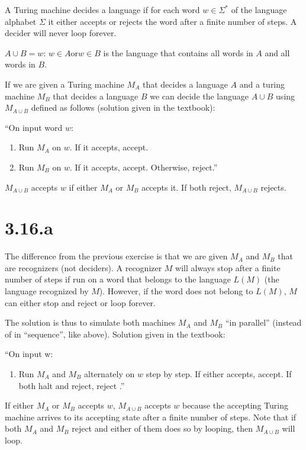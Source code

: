 \documentclass{article}
\newcommand\st{\colon\,}
\begin{document}
A Turing machine decides a language if for each word \(w \in \Sigma^{*}\)
of the language alphabet \(\Sigma\)
it either accepts or rejects the word after a finite number of steps. A decider
will never loop forever.

\(A \cup B = {w \st w \in A \text{or} w \in B}\)
is the language that contains all words in \(A\) and all words in \(B\).

If we are given a Turing machine \(M_A\) that decides a language \(A\) and
a turing machine \(M_B\) that decides a language \(B\) we can decide the
language \(A \cup B\) using \(M_{A \cup B}\) defined as follows
(solution given in the textbook):

``On input word \(w\):
\begin{enumerate}
	\item Run \(M_A\) on \(w\). If it accepts, accept.
	\item Run \(M_B\) on \(w\). If it accepts, accept. Otherwise, reject.''
\end{enumerate}
\(M_{A \cup B}\) accepts \(w\) if either \(M_A\) or \(M_B\) accepts it.
If both reject, \(M_{A \cup B}\) rejects.

\section*{3.16.a}

The difference from the previous exercise is that we are given \(M_A\) and
\(M_B\) that are recognizers (not deciders). A recognizer \(M\) will always stop
after a finite number of steps if run on a word that belongs to the language
\(L(M)\) (the language recognized by \(M\)).
However, if the word does not belong to \(L(M)\), \(M\) can either stop and reject or loop forever.

The solution is thus to simulate both machines \(M_A\) and \(M_B\) ``in
parallel'' (instead of in ``sequence'', like above). Solution given in the textbook:

``On input w:
\begin{enumerate}
	\item Run \(M_A\) and \(M_B\) alternately on \(w\) step by step. If either accepts,
accept. If both halt and reject, reject .''
\end{enumerate}

If either \(M_A\) or \(M_B\) accepts \(w\), \(M_{A \cup B}\) accepts \(w\)
because the accepting Turing machine arrives to its
accepting state after a finite number of steps. Note that if both \(M_A\) and
\(M_B\) reject and either of them does so by looping, then \(M_{A \cup B}\)
will loop.
\end{document}
